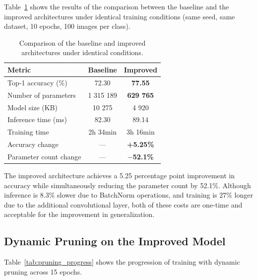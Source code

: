 \documentclass[letterpaper, 10 pt, conference]{ieeeconf}
\begin{document}
Table~\ref{tab:v1_vs_v2} shows the results of the comparison between the baseline and the improved architectures under identical training conditions (same seed, same dataset, 10 epochs, 100 images per class).

\begin{table}[h]
\caption{Comparison of the baseline and improved architectures under identical conditions.}
\label{tab:v1_vs_v2}
\begin{center}
\begin{tabular}{lcc}
\toprule
\textbf{Metric} & \textbf{Baseline} & \textbf{Improved} \\
\midrule
Top-1 accuracy (\%)     & 72.30  & \textbf{77.55} \\
Number of parameters    & 1 315 189 & \textbf{629 765} \\
Model size (KB)         & 10 275  & 4 920 \\
Inference time (ms)     & 82.30 & 89.14 \\
Training time           & 2h 34min & 3h 16min \\
\midrule
Accuracy change         & --- & \textbf{+5.25\%} \\
Parameter count change  & --- & \textbf{$-$52.1\%} \\
\bottomrule
\end{tabular}
\end{center}
\end{table}

The improved architecture achieves a 5.25 percentage point improvement in accuracy while simultaneously reducing the parameter count by 52.1\%.
Although inference is 8.3\% slower due to BatchNorm operations, and training is 27\% longer due to the additional convolutional layer, both of these costs are one-time and acceptable for the improvement in generalization.

\subsection{Dynamic Pruning on the Improved Model}

Table~\ref{tab:pruning_progress} shows the progression of training with dynamic pruning across 15 epochs.
\end{document}

